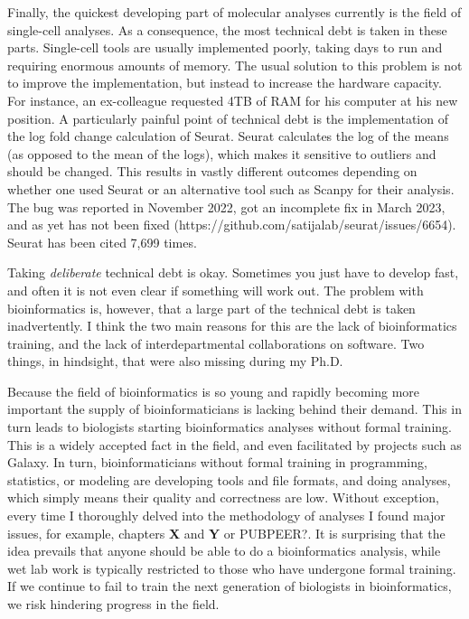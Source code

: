 Finally, the quickest developing part of molecular analyses currently is the field of single-cell analyses. As a consequence, the most technical debt is taken in these parts. Single-cell tools are usually implemented poorly, taking days to run and requiring enormous amounts of memory. The usual solution to this problem is not to improve the implementation, but instead to increase the hardware capacity. For instance, an ex-colleague requested 4TB of RAM for his computer at his new position. A particularly painful point of technical debt is the implementation of the log fold change calculation of Seurat. Seurat calculates the log of the means (as opposed to the mean of the logs), which makes it sensitive to outliers and should be changed. This results in vastly different outcomes depending on whether one used Seurat or an alternative tool such as Scanpy for their analysis. The bug was reported in November 2022, got an incomplete fix in March 2023, and as yet has not been fixed (https://github.com/satijalab/seurat/issues/6654). Seurat has been cited 7,699 times\cite{Butler2018}.

Taking \textit{deliberate} technical debt is okay. Sometimes you just have to develop fast, and often it is not even clear if something will work out. The problem with bioinformatics is, however, that a large part of the technical debt is taken inadvertently. I think the two main reasons for this are the lack of bioinformatics training, and the lack of interdepartmental collaborations on software. Two things, in hindsight, that were also missing during my Ph.D. 

Because the field of bioinformatics is so young and rapidly becoming more important the supply of bioinformaticians is lacking behind their demand. This in turn leads to biologists starting bioinformatics analyses without formal training. This is a widely accepted fact in the field, and even facilitated by projects such as Galaxy\cite{galaxy}. In turn, bioinformaticians without formal training in programming, statistics, or modeling are  developing tools and file formats, and doing analyses, which simply means their quality and correctness are low. Without exception, every time I thoroughly delved into the methodology of analyses I found major issues, for example, chapters \textbf{X} and \textbf{Y} or PUBPEER?. It is surprising that the idea prevails that anyone should be able to do a bioinformatics analysis, while wet lab work is typically restricted to those who have undergone formal training. If we continue to fail to train the next generation of biologists in bioinformatics, we risk hindering progress in the field.

